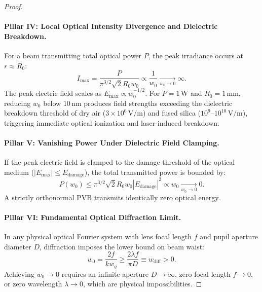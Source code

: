 \documentclass{optica-article}
\begin{document}
\begin{proof}
\paragraph{Pillar IV: Local Optical Intensity Divergence and Dielectric Breakdown.}
For a beam transmitting total optical power $P$, the peak irradiance occurs at $r \approx R_0$:
\begin{equation}
I_{\max} = \frac{P}{\pi^{3/2} \sqrt{2} R_0 w_0} \propto \frac{1}{w_0} \xrightarrow[w_0 \to 0]{} \infty.
\end{equation}
The peak electric field scales as $E_{\max} \propto w_0^{-1/2}$. For $P = 1\,\text{W}$ and $R_0 = 1\,\text{mm}$, reducing $w_0$ below $10\,\text{nm}$ produces field strengths exceeding the dielectric breakdown threshold of dry air ($3 \times 10^6\,\text{V/m}$) and fused silica ($10^9\text{--}10^{10}\,\text{V/m}$), triggering immediate optical ionization and laser-induced breakdown.

\paragraph{Pillar V: Vanishing Power Under Dielectric Field Clamping.}
If the peak electric field is clamped to the damage threshold of the optical medium ($|E_{\max}| \le E_{\text{damage}}$), the total transmitted power is bounded by:
\begin{equation}
P(w_0) \le \pi^{3/2} \sqrt{2} R_0 w_0 |E_{\text{damage}}|^2 \propto w_0 \xrightarrow[w_0 \to 0]{} 0.
\end{equation}
A strictly orthonormal PVB transmits identically zero optical energy.

\paragraph{Pillar VI: Fundamental Optical Diffraction Limit.}
In any physical optical Fourier system with lens focal length $f$ and pupil aperture diameter $D$, diffraction imposes the lower bound on beam waist:
\begin{equation}
w_0 = \frac{2 f}{k w_g} \ge \frac{2 \lambda f}{\pi D} \equiv w_{\text{diff}} > 0.
\end{equation}
Achieving $w_0 \to 0$ requires an infinite aperture $D \to \infty$, zero focal length $f \to 0$, or zero wavelength $\lambda \to 0$, which are physical impossibilities.


\end{proof}
\end{document}

